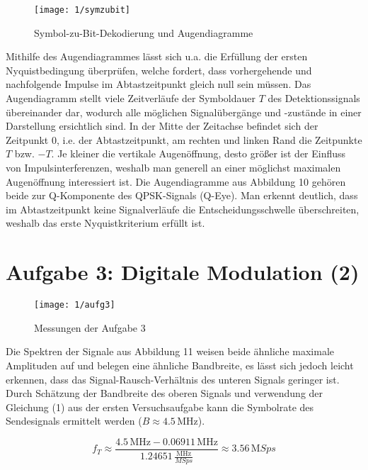 \documentclass[a4paper, 12pt]{article}
\begin{document}
  \begin{figure}[H]
    \begin{center}
      \texttt{[image: 1/symzubit]}
    \end{center}
    \caption{Symbol-zu-Bit-Dekodierung und Augendiagramme}
  \end{figure}

  Mithilfe des Augendiagrammes lässt sich u.a. die Erfüllung der ersten
  Nyquistbedingung überprüfen, welche fordert, dass vorhergehende und nachfolgende Impulse im
  Abtastzeitpunkt gleich null sein müssen. Das Augendiagramm stellt viele
  Zeitverläufe der Symboldauer $T$ des Detektionssignals übereinander dar, wodurch alle
  möglichen Signalübergänge und -zustände in
  einer Darstellung ersichtlich sind. In der Mitte der Zeitachse befindet sich
  der Zeitpunkt 0, i.e. der Abtastzeitpunkt, am rechten und linken Rand die
  Zeitpunkte $T$ bzw. $-T$.  Je kleiner die
  vertikale Augenöffnung, desto größer ist der Einfluss von Impulsinterferenzen,
  weshalb man generell an einer möglichst maximalen Augenöffnung interessiert ist.
  Die Augendiagramme aus Abbildung 10 gehören beide zur Q-Komponente des
  QPSK-Signals (Q-Eye). Man erkennt deutlich, dass im Abtastzeitpunkt keine
  Signalverläufe die Entscheidungsschwelle überschreiten, weshalb das erste
  Nyquistkriterium erfüllt ist.

  \section{Aufgabe 3: Digitale Modulation (2)}

  \begin{figure}[H]
    \begin{center}
      \texttt{[image: 1/aufg3]}
    \end{center}
    \caption{Messungen der Aufgabe 3}
  \end{figure}

  
  Die Spektren der Signale aus Abbildung 11 weisen beide ähnliche maximale
  Amplituden auf und belegen eine ähnliche Bandbreite, es lässt sich jedoch leicht
  erkennen, dass das Signal-Rausch-Verhältnis des unteren Signals geringer ist.
  Durch Schätzung der Bandbreite des oberen Signals und verwendung der Gleichung
  (1) aus der ersten Versuchsaufgabe kann die Symbolrate des Sendesignals
  ermittelt werden ($B \approx 4.5 \, \si{\mega\hertz}$).

  \[f_T \approx \frac{4.5 \, \si{\mega\hertz} - 0.06911 \, \si{\mega\hertz}}{1.24651
      \, \frac{\si{\mega\hertz}}{\si{MSps}}} \approx 3.56 \, \si{\mega Sps}\]
\end{document}
